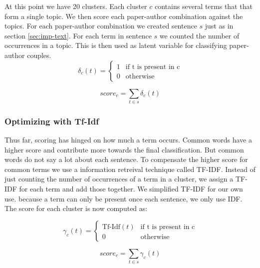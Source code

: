 At this point we have 20 clusters. Each cluster $c$ contains several terms that that form a single topic. We then score each paper-author combination against the topics. For each  paper-author combination we created sentence $s$ just as in section \ref{sec:imp-text}. For each term in sentence $s$ we counted the number of occurrences in a topic. This is then used as latent variable for classifying paper-author couples.
\[ \delta_c(t) =\left\{ \begin{matrix} 1 & \mbox{if t is present in c} \\ 0 & \mbox{otherwise} \end{matrix} \right.\]

\[ score_c = \sum_{t \in s} \delta_c(t) \]

\subsubsection*{Optimizing with Tf-Idf}

Thus far, scoring has hinged on how much a term occurs. Common words have a higher score and contribute more towards the final classification. But common words do not say a lot about each sentence\cite{chowdhury2010introduction}. To compensate the higher score for common terms we use a information retreival technique called TF-IDF. Instead of just counting the number of occurrences of a term in a cluster, we assign a TF-IDF for each term and add those together. We simplified TF-IDF for our own use. because a term can only be present once each sentence, we only use IDF. The score for each cluster is now computed as:

\[ \gamma_c(t) =\left\{ \begin{matrix} \mbox{Tf-Idf}(t) & \mbox{if t is present in c} \\ 0 & \mbox{otherwise} \end{matrix} \right.\]


\[ score_c = \sum_{t \in s} \gamma_c(t) \]
